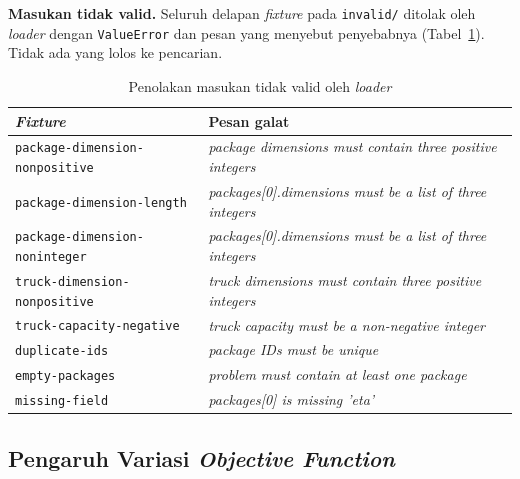\textbf{Masukan tidak valid.} Seluruh delapan \textit{fixture} pada \texttt{invalid/} ditolak oleh \textit{loader} dengan \texttt{ValueError} dan pesan yang menyebut penyebabnya (Tabel~\ref{tab:invalid}). Tidak ada yang lolos ke pencarian.

\begin{table}[H]
    \centering
    \small
    \begin{tabular}{@{}p{5.2cm}p{9.5cm}@{}}
        \toprule
        \textit{Fixture}                       & Pesan galat                                                      \\
        \midrule
        \texttt{package-dimension-nonpositive} & \textit{package dimensions must contain three positive integers} \\
        \texttt{package-dimension-length}      & \textit{packages[0].dimensions must be a list of three integers} \\
        \texttt{package-dimension-noninteger}  & \textit{packages[0].dimensions must be a list of three integers} \\
        \texttt{truck-dimension-nonpositive}   & \textit{truck dimensions must contain three positive integers}   \\
        \texttt{truck-capacity-negative}       & \textit{truck capacity must be a non-negative integer}           \\
        \texttt{duplicate-ids}                 & \textit{package IDs must be unique}                              \\
        \texttt{empty-packages}                & \textit{problem must contain at least one package}               \\
        \texttt{missing-field}                 & \textit{packages[0] is missing 'eta'}                            \\
        \bottomrule
    \end{tabular}
    \caption{Penolakan masukan tidak valid oleh \textit{loader}}
    \label{tab:invalid}
\end{table}

\subsection{Pengaruh Variasi \textit{Objective Function}}

